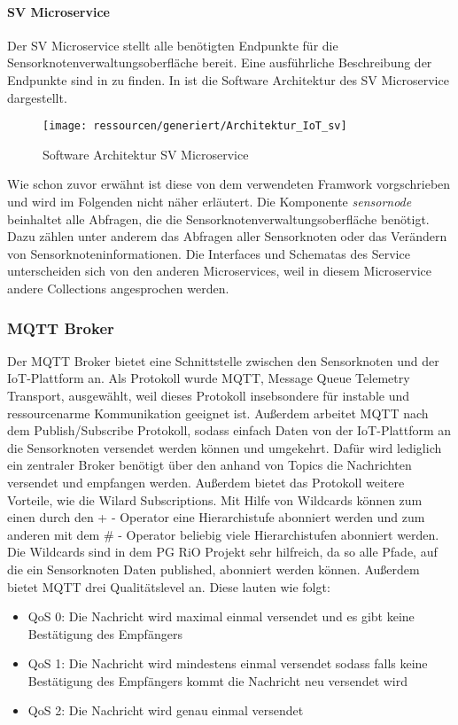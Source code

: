 \paragraph{SV Microservice} 
Der SV Microservice stellt alle benötigten Endpunkte für die Sensorknotenverwaltungsoberfläche bereit.
Eine ausführliche Beschreibung der Endpunkte sind in  zu finden.
In  ist die Software Architektur des SV Microservice dargestellt.
\begin{figure}[!htb]
	\centering
	\texttt{[image: ressourcen/generiert/Architektur\_IoT\_sv]}
	\caption{Software Architektur SV Microservice}
	\label{fig:svarchi}
\end{figure}
Wie schon zuvor erwähnt ist diese von dem verwendeten Framwork vorgschrieben und wird im Folgenden nicht näher erläutert.
Die Komponente \textit{sensornode} beinhaltet alle Abfragen, die die Sensorknotenverwaltungsoberfläche benötigt.
Dazu zählen unter anderem das Abfragen aller Sensorknoten oder das Verändern von Sensorknoteninformationen.
Die Interfaces und Schematas des Service unterscheiden sich von den anderen Microservices, weil in diesem Microservice andere Collections angesprochen werden.
\FloatBarrier

\subsubsection{MQTT Broker}
\label{sec:arch:iot:mqtt}
Der MQTT Broker bietet eine Schnittstelle zwischen den Sensorknoten und der IoT-Plattform an.
Als Protokoll wurde MQTT, Message Queue Telemetry Transport, ausgewählt, weil dieses Protokoll insebsondere für instable und ressourcenarme Kommunikation geeignet ist.
Außerdem arbeitet MQTT nach dem Publish/Subscribe Protokoll, sodass einfach Daten von der IoT-Plattform an die Sensorknoten versendet werden können und umgekehrt.
Dafür wird lediglich ein zentraler Broker benötigt über den anhand von Topics die Nachrichten versendet und empfangen werden.
Außerdem bietet das Protokoll weitere Vorteile, wie die Wilard Subscriptions.
Mit Hilfe von Wildcards können zum einen durch den + - Operator eine Hierarchistufe abonniert werden und zum anderen mit dem \# - Operator beliebig viele Hierarchistufen abonniert werden.
Die Wildcards sind in dem PG RiO Projekt sehr hilfreich, da so alle Pfade, auf die ein Sensorknoten Daten published, abonniert werden können.
Außerdem bietet MQTT drei Qualitätslevel an.
Diese lauten wie folgt: \cite{mqtt}
\begin{itemize}
	\item QoS 0: Die Nachricht wird maximal einmal versendet und es gibt keine Bestätigung des Empfängers
	\item QoS 1: Die Nachricht wird mindestens einmal versendet sodass falls keine Bestätigung des Empfängers kommt die Nachricht neu versendet wird
	\item QoS 2: Die Nachricht wird genau einmal versendet
\end{itemize}

